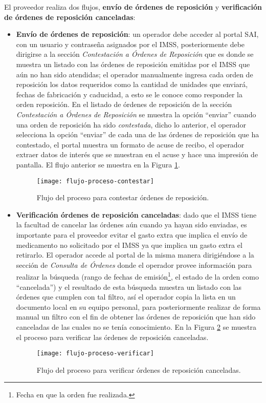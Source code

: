 El proveedor realiza dos flujos, \textbf{envío de órdenes de reposición} y \textbf{verificación de órdenes de reposición canceladas}:
\begin{itemize}
\item \textbf{Envío de órdenes de reposición}: un operador debe acceder al portal SAI, con un usuario y contraseña asignados por el IMSS, posteriormente debe dirigirse a la sección \textit{Contestación a Órdenes de Reposición} que es donde se muestra un listado con las órdenes de reposición emitidas por el IMSS que aún no han sido atendidas; el operador manualmente ingresa cada orden de reposición los datos requeridos como la cantidad de unidades que enviará, fechas de fabricación y caducidad, a esto se le conoce como responder la orden reposición. En el listado de órdenes de reposición de la sección \textit{Contestación a Órdenes de Reposición} se muestra la opción ``enviar'' cuando una orden de reposición ha sido \textit{contestada}, dicho lo anterior, el operador selecciona la opción ``enviar'' de cada una de las órdenes de reposición que ha contestado, el portal muestra un formato de acuse de recibo, el operador extraer datos de interés que se muestran en el acuse y hace una impresión de pantalla. El flujo anterior se muestra en la Figura \ref{fig:flow-proc-contestar}.

\begin{figure}[h]
\centering
\texttt{[image: flujo-proceso-contestar]} 
\caption{Flujo del proceso para contestar órdenes de reposición.}
\label{fig:flow-proc-contestar}
\end{figure}
\item \textbf{Verificación órdenes de reposición canceladas}: dado que el IMSS tiene la facultad de cancelar las órdenes aún cuando ya hayan sido enviadas, es importante para el proveedor evitar el gasto extra que implica el envío de medicamento no solicitado por el IMSS ya que implica un gasto extra el retirarlo. El operador accede al portal de la misma manera dirigiéndose a la sección de \textit{Consulta de Órdenes} donde el operador provee información para realizar la búsqueda (rango de fechas de emisión\footnote{Fecha en que la orden fue realizada.}, el estado de la orden como ``cancelada'') y el resultado de esta búsqueda muestra un listado con las órdenes que cumplen con tal filtro, así el operador copia la lista en un documento local en su equipo personal, para posteriormente realizar de forma manual un filtro con el fin de obtener las órdenes de reposición que han sido canceladas de las cuales no se tenía conocimiento. En la Figura \ref{fig:flow-proc-verificar} se muestra el proceso para verificar las órdenes de reposición canceladas.
\begin{figure}[h]
\centering
\texttt{[image: flujo-proceso-verificar]} 
\caption{Flujo del proceso para verificar órdenes de reposición canceladas.}
\label{fig:flow-proc-verificar}
\end{figure}
\end{itemize}

